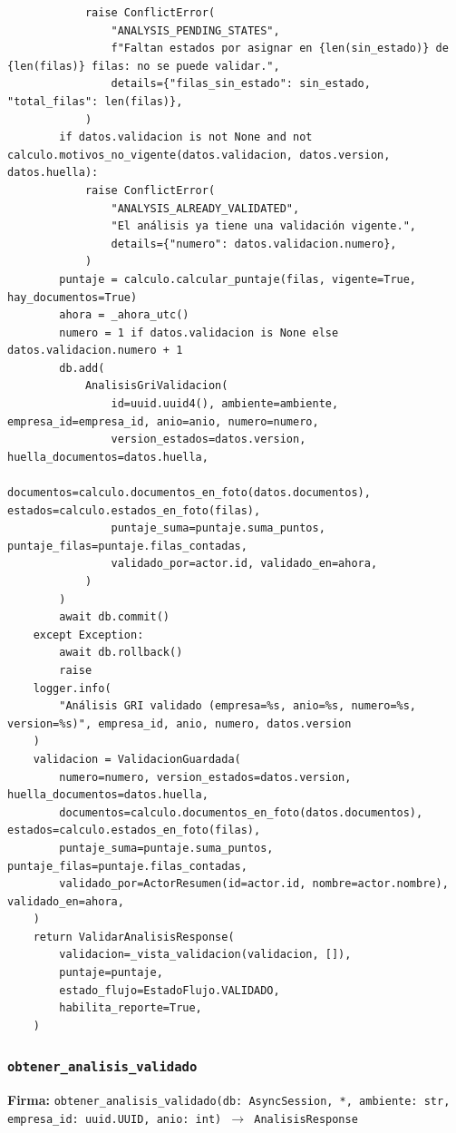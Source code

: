 \documentclass[11pt,a4paper]{article}
\begin{document}
\begin{lstlisting}
            raise ConflictError(
                "ANALYSIS_PENDING_STATES",
                f"Faltan estados por asignar en {len(sin_estado)} de {len(filas)} filas: no se puede validar.",
                details={"filas_sin_estado": sin_estado, "total_filas": len(filas)},
            )
        if datos.validacion is not None and not calculo.motivos_no_vigente(datos.validacion, datos.version, datos.huella):
            raise ConflictError(
                "ANALYSIS_ALREADY_VALIDATED",
                "El análisis ya tiene una validación vigente.",
                details={"numero": datos.validacion.numero},
            )
        puntaje = calculo.calcular_puntaje(filas, vigente=True, hay_documentos=True)
        ahora = _ahora_utc()
        numero = 1 if datos.validacion is None else datos.validacion.numero + 1
        db.add(
            AnalisisGriValidacion(
                id=uuid.uuid4(), ambiente=ambiente, empresa_id=empresa_id, anio=anio, numero=numero,
                version_estados=datos.version, huella_documentos=datos.huella,
                documentos=calculo.documentos_en_foto(datos.documentos), estados=calculo.estados_en_foto(filas),
                puntaje_suma=puntaje.suma_puntos, puntaje_filas=puntaje.filas_contadas,
                validado_por=actor.id, validado_en=ahora,
            )
        )
        await db.commit()
    except Exception:
        await db.rollback()
        raise
    logger.info(
        "Análisis GRI validado (empresa=%s, anio=%s, numero=%s, version=%s)", empresa_id, anio, numero, datos.version
    )
    validacion = ValidacionGuardada(
        numero=numero, version_estados=datos.version, huella_documentos=datos.huella,
        documentos=calculo.documentos_en_foto(datos.documentos), estados=calculo.estados_en_foto(filas),
        puntaje_suma=puntaje.suma_puntos, puntaje_filas=puntaje.filas_contadas,
        validado_por=ActorResumen(id=actor.id, nombre=actor.nombre), validado_en=ahora,
    )
    return ValidarAnalisisResponse(
        validacion=_vista_validacion(validacion, []),
        puntaje=puntaje,
        estado_flujo=EstadoFlujo.VALIDADO,
        habilita_reporte=True,
    )
\end{lstlisting}

\subsubsection*{\texttt{obtener\_analisis\_validado}}
\textbf{Firma:} \texttt{obtener\_analisis\_validado(db: AsyncSession, *, ambiente: str, empresa\_id: uuid.UUID, anio: int) $\rightarrow$ AnalisisResponse}
\end{document}
